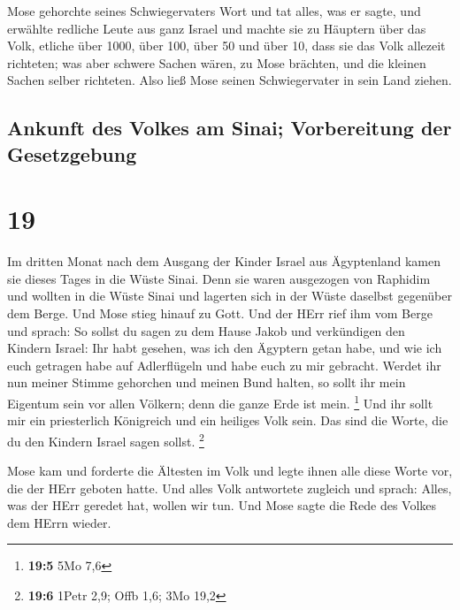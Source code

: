  Mose gehorchte seines Schwiegervaters Wort und tat
alles, was er sagte,  und erwählte redliche Leute aus
ganz Israel und machte sie zu Häuptern über das Volk, etliche über 1000,
über 100, über 50 und über 10,  dass sie das Volk
allezeit richteten; was aber schwere Sachen wären, zu Mose brächten, und
die kleinen Sachen selber richteten.  Also ließ Mose
seinen Schwiegervater in sein Land ziehen.

\hypertarget{ankunft-des-volkes-am-sinai-vorbereitung-der-gesetzgebung}{%
\subsection{Ankunft des Volkes am Sinai; Vorbereitung der
Gesetzgebung}\label{ankunft-des-volkes-am-sinai-vorbereitung-der-gesetzgebung}}

\hypertarget{section-18}{%
\section{19}\label{section-18}}

 Im dritten Monat nach dem Ausgang der Kinder Israel aus
Ägyptenland kamen sie dieses Tages in die Wüste Sinai. 
Denn sie waren ausgezogen von Raphidim und wollten in die Wüste Sinai
und lagerten sich in der Wüste daselbst gegenüber dem Berge.
 Und Mose stieg hinauf zu Gott. Und der HErr rief ihm vom
Berge und sprach: So sollst du sagen zu dem Hause Jakob und verkündigen
den Kindern Israel:  Ihr habt gesehen, was ich den
Ägyptern getan habe, und wie ich euch getragen habe auf Adlerflügeln und
habe euch zu mir gebracht.  Werdet ihr nun meiner Stimme
gehorchen und meinen Bund halten, so sollt ihr mein Eigentum sein vor
allen Völkern; denn die ganze Erde ist mein. \footnote{\textbf{19:5} 5Mo
  7,6}  Und ihr sollt mir ein priesterlich Königreich und
ein heiliges Volk sein. Das sind die Worte, die du den Kindern Israel
sagen sollst. \footnote{\textbf{19:6} 1Petr 2,9; Offb 1,6; 3Mo 19,2}

 Mose kam und forderte die Ältesten im Volk und legte
ihnen alle diese Worte vor, die der HErr geboten hatte. 
Und alles Volk antwortete zugleich und sprach: Alles, was der HErr
geredet hat, wollen wir tun. Und Mose sagte die Rede des Volkes dem
HErrn wieder.

